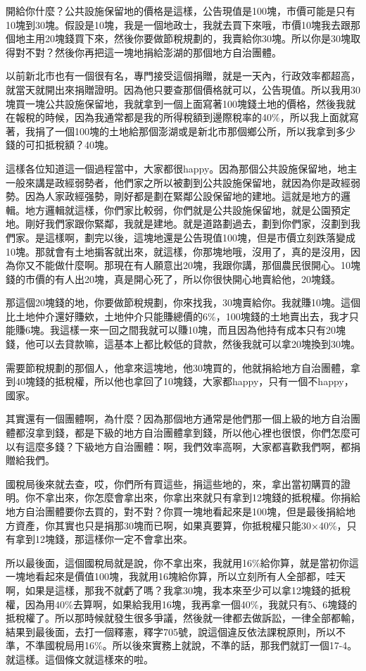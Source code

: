 \documentclass[]{ctexbook}
\begin{document}
開給你什麼？公共設施保留地的價格是這樣，公告現值是100塊，市價可能是只有10塊到30塊。假設是10塊，我是一個地政士，我就去買下來哦，市價10塊我去跟那個地主用20塊錢買下來，然後你要做節稅規劃的，我賣給你30塊。所以你是30塊取得對不對？然後你再把這一塊地捐給澎湖的那個地方自治團體。

以前新北市也有一個很有名，專門接受這個捐贈，就是一天內，行政效率都超高，就當天就開出來捐贈證明。因為他只要查那個價格就可以，公告現值。所以我用30塊買一塊公共設施保留地，我就拿到一個上面寫著100塊錢土地的價格，然後我就在報稅的時候，因為我通常都是我的所得稅額到邊際稅率的40\%，所以我上面就寫著，我捐了一個100塊的土地給那個澎湖或是新北市那個鄉公所，所以我拿到多少錢的可扣抵稅額？40塊。

這樣各位知道這一個過程當中，大家都很happy。因為那個公共設施保留地，地主一般來講是政經弱勢者，他們家之所以被劃到公共設施保留地，就因為你是政經弱勢。因為人家政經强勢，剛好都是劃在緊鄰公設保留地的建地。這就是地方的邏輯。地方邏輯就這樣，你們家比較弱，你們就是公共設施保留地，就是公園預定地。剛好我們家跟你緊鄰，我就是建地。就是道路劃過去，劃到你們家，沒劃到我們家。是這樣啊，劃完以後，這塊地還是公告現值100塊，但是市價立刻跌落變成10塊。那就會有土地掮客就出來，就這樣，你那塊地哦，沒用了，真的是沒用，因為你又不能做什麼啊。那現在有人願意出20塊，我跟你講，那個農民很開心。10塊錢的市價的有人出20塊，真是開心死了，所以你很快開心地賣給他，20塊錢。

那這個20塊錢的地，你要做節稅規劃，你來找我，30塊賣給你。我就賺10塊。這個比土地仲介還好賺欸，土地仲介只能賺總價的6\%，100塊錢的土地賣出去，我才只能賺6塊。我這樣一來一回之間我就可以賺10塊，而且因為他持有成本只有20塊錢，他可以去貸款嘛，這基本上都比較低的貸款，然後我就可以拿20塊換到30塊。

需要節稅規劃的那個人，他拿來這塊地，他30塊買的，他就捐給地方自治團體，拿到40塊錢的抵稅權，所以他也拿回了10塊錢，大家都happy，只有一個不happy，國家。

其實還有一個團體啊，為什麼？因為那個地方通常是他們那一個上級的地方自治團體都沒拿到錢，都是下級的地方自治團體拿到錢，所以他心裡也很恨，你們怎麼可以有這麼多錢？下級地方自治團體：啊，我們效率高啊，大家都喜歡我們啊，都捐贈給我們。

國稅局後來就去查，哎，你們所有買這些，捐這些地的，來，拿出當初購買的證明。你不拿出來，你怎麼會拿出來，你拿出來就只有拿到12塊錢的抵稅權。你捐給地方自治團體要你去買的，對不對？你買一塊地看起來是100塊，但是最後捐給地方資產，你其實也只是捐那30塊而已啊，如果真要算，你抵稅權只能30×40\%，只有拿到12塊錢，那這樣你一定不會拿出來。

所以最後面，這個國稅局就是說，你不拿出來，我就用16\%給你算，就是當初你這一塊地看起來是價值100塊，我就用16塊給你算，所以立刻所有人全部都，哇天啊，如果是這樣，那我不就虧了嗎？我拿30塊，我本來至少可以拿12塊錢的抵稅權，因為用40\%去算啊，如果給我用16塊，我再拿一個40\%，我就只有5、6塊錢的抵稅權了。所以那時候就發生很多爭議，然後就一律都去做訴訟，一律全部都輸，結果到最後面，去打一個釋憲，釋字705號，說這個違反依法課稅原則，所以不準，不準國稅局用16\%。所以後來實務上就說，不準的話，那我們就訂一個17-4。就這樣。這個條文就這樣來的啦。
\end{document}
